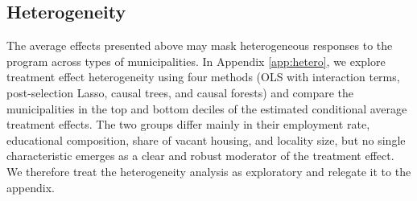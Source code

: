 \subsection{Heterogeneity}

The average effects presented above may mask heterogeneous responses to the program across types of municipalities. In Appendix \ref{app:hetero}, we explore treatment effect heterogeneity using four methods (OLS with interaction terms, post-selection Lasso, causal trees, and causal forests) and compare the municipalities in the top and bottom deciles of the estimated conditional average treatment effects. The two groups differ mainly in their employment rate, educational composition, share of vacant housing, and locality size, but no single characteristic emerges as a clear and robust moderator of the treatment effect. We therefore treat the heterogeneity analysis as exploratory and relegate it to the appendix.
